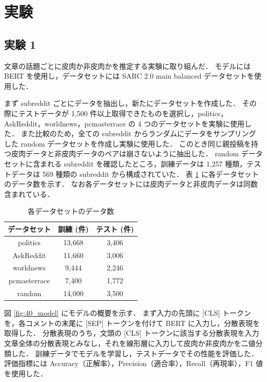 \newpage

\changeindent{0cm}
\section{実験}
\changeindent{2cm}

\subsection{実験 1}

文章の話題ごとに皮肉か非皮肉かを推定する実験に取り組んだ．
モデルには BERT を使用し，データセットには SARC 2.0 main balanced データセットを使用した．
\par
まず subreddit ごとにデータを抽出し，新たにデータセットを作成した．
その際にテストデータが 1,500 件以上取得できたものを選択し，politics，AskReddit，worldnews，pcmasterrace の 4 つのデータセットを実験に使用した．
また比較のため，全ての subreddit からランダムにデータをサンプリングした random データセットを作成し実験に使用した．
このとき同じ親投稿を持つ皮肉データと非皮肉データのペアは崩さないように抽出した．
random データセットに含まれる subreddit を確認したところ，訓練データは 1,257 種類，テストデータは 569 種類の subreddit から構成されていた．
表 \ref{tb:4_subreddit_data} に各データセットのデータ数を示す．
なお各データセットには皮肉データと非皮肉データは同数含まれている．

\begin{table}[b]
  \caption{各データセットのデータ数}
  \label{tb:4_subreddit_data}
  \centering
  \begin{tabular}{c c c} \hline

データセット & 訓練 (件) & テスト (件) \\ \hline
politics & 13,668 & 3,406 \\
AskReddit & 11,660 & 3,006 \\
worldnews & 9,444 & 2,246 \\
pcmasterrace & 7,400 & 1,772 \\
random & 14,000 & 3,500 \\ \hline

  \end{tabular}
\end{table}

\par
図 \ref{fig:40_model} にモデルの概要を示す．
まず入力の先頭に [CLS] トークンを，各コメントの末尾に [SEP] トークンを付けて BERT に入力し，分散表現を取得した．
分散表現のうち，文頭の [CLS] トークンに該当する分散表現を入力文章全体の分散表現とみなし，それを線形層に入力して皮肉か非皮肉かを二値分類した．
訓練データでモデルを学習し，テストデータでその性能を評価した．
評価指標には Accuracy（正解率），Precision（適合率），Recall（再現率），F1 値を使用した．

